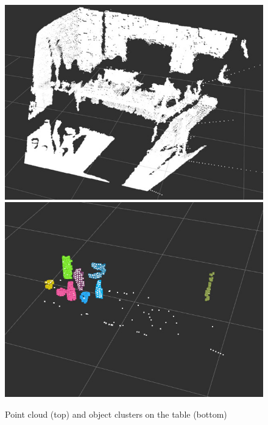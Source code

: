 \documentclass[a4paper, twocolumn]{article}
\begin{document}
    \begin{figure}
        \includegraphics[width=\columnwidth]{../img/table_pcl.jpg}
        \includegraphics[width=\columnwidth]{../img/cluster_obj_pcl.jpg}
        \caption{Point cloud (top) and object clusters on the table (bottom)}
        \label{pcl_clust}
    \end{figure}
\end{document}
